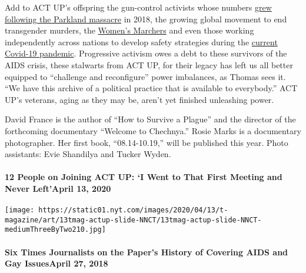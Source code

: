 Add to ACT UP's offspring the gun-control activists whose numbers
\href{https://www.nytimes.com/2019/02/13/us/parkland-shooting.html}{grew
following the Parkland massacre} in 2018, the growing global movement to
end transgender murders, the
\href{https://www.nytimes.com/2017/01/21/us/womens-march.html}{Women's
Marchers} and even those working independently across nations to develop
safety strategies during the
\href{https://www.nytimes.com/news-event/coronavirus}{current Covid-19
pandemic}. Progressive activism owes a debt to these survivors of the
AIDS crisis, these stalwarts from ACT UP, for their legacy has left us
all better equipped to ``challenge and reconfigure'' power imbalances,
as Thomas sees it. ``We have this archive of a political practice that
is available to everybody.'' ACT UP's veterans, aging as they may be,
aren't yet finished unleashing power.

David France is the author of ``How to Survive a Plague'' and the
director of the forthcoming documentary ``Welcome to Chechnya.'' Rosie
Marks is a documentary photographer. Her first book, ``08.14-10.19,''
will be published this year. Photo assistants: Evie Shandilya and Tucker
Wyden.

\href{https://www.nytimes.com/2020/04/13/t-magazine/act-up-members.html}{}

\hypertarget{12-people-on-joining-act-up-i-went-to-that-first-meeting-and-never-leftapril-13-2020}{%
\paragraph{12 People on Joining ACT UP: `I Went to That First Meeting
and Never Left'April 13,
2020}\label{12-people-on-joining-act-up-i-went-to-that-first-meeting-and-never-leftapril-13-2020}}

\texttt{[image: https://static01.nyt.com/images/2020/04/13/t-magazine/art/13tmag-actup-slide-NNCT/13tmag-actup-slide-NNCT-mediumThreeByTwo210.jpg]}
\href{https://www.nytimes.com/2018/04/27/t-magazine/times-journalists-aids-gay-history.html}{}

\hypertarget{six-times-journalists-on-the-papers-history-of-covering-aids-and-gay-issuesapril-27-2018}{%
\paragraph{Six Times Journalists on the Paper's History of Covering AIDS
and Gay IssuesApril 27,
2018}\label{six-times-journalists-on-the-papers-history-of-covering-aids-and-gay-issuesapril-27-2018}}

